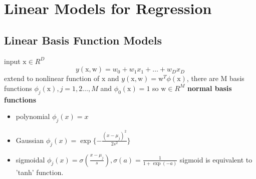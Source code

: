 \documentclass[a4paper]{book}
\begin{document}
\section{Linear Models for Regression}
\subsection{Linear Basis Function Models}
input $\mathrm x\in R^D$
\begin{equation}\label{eq2.2.1}
  y(\mathrm x,\mathrm w) = w_0+w_1x_1+\dots +w_Dx_D
\end{equation}
extend to nonlinear function of $\mathrm x$ and $y(\mathrm x,\mathrm w) =\mathrm w^T\phi(\mathrm x)$, there are M basis functions $\phi_j(\mathrm x), j=1,2\dots,M$ and $\phi_0(\mathrm x) = 1$\newline
so $\mathrm w\in R^M$
\textbf{normal basis functions}
\begin{itemize}
  \item polynomial $\phi_j(x) = x$
  \item Gaussian $\phi_j(x) = \exp\{-\frac{(x-\mu_j)^2}{2s^2}\}$
  \item sigmoidal $\phi_j(x) = \sigma(\frac{x-\mu_j}{s}) , \sigma(a) = \frac1{1+\exp(-a)}$ sigmoid is equivalent to 'tanh' function.
\end{itemize}
\end{document}
